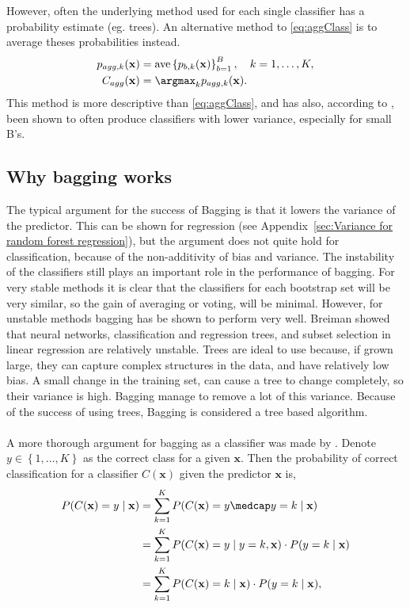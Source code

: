 However, often the underlying method used for each single classifier has a probability estimate (eg. trees). An alternative method to \eqref{eq:aggClass} is to average theses probabilities instead.
\begin{align}
  p_{agg, k}(\mathbf{x}) &=  \mathrm{ave}\left\{ p_{b, k}(\mathbf{x}) \right\}_{b = 1}^{B}, \quad k = 1, \ldots, K, \\
  \label{eq:aggClassP} 
  C_{agg}(\mathbf{x}) &= \argmax_k p_{agg, k}(\mathbf{x}).
\end{align}
This method is more descriptive than \eqref{eq:aggClass}, and has also, according to \cite{modstat}, been shown to often produce classifiers with lower variance, especially for small B's.

\subsection{Why bagging works}
\label{sub:Why bagging works}
The typical argument for the success of Bagging is that it lowers the variance of the predictor. This can be shown for regression (see Appendix~\ref{sec:Variance for random forest regression}), but the argument does not quite hold for classification, because of the non-additivity of bias and variance. The instability of the classifiers still plays an important role in the performance of bagging. For very stable methods it is clear that the classifiers for each bootstrap set will be very similar, so the gain of averaging or voting, will be minimal. However, for unstable methods bagging has be shown to perform very well. Breiman showed that neural networks, classification and regression trees, and subset selection in linear regression are relatively unstable.
Trees are ideal to use because, if grown large, they can capture complex structures in the data, and have relatively low bias. A small change in the training set, can cause a tree to change completely, so their variance is high. Bagging manage to remove a lot of this variance. Because of the success of using trees, Bagging is considered a tree based algorithm.
\\
\\
A more thorough argument for bagging as a classifier was made by \cite{Breiman1996}. Denote $y \in \left\{ 1, \ldots, K \right\}$ as the correct class for a given $\mathbf{x}$. Then the probability of correct classification for a classifier $C(\mathbf{x})$ given the predictor $\mathbf{x}$ is,
\begin{align}
  P(C(\mathbf{x}) = y \mid \mathbf{x})  &= \sum^{K}_{k=1} P(C(\mathbf{x})=y \medcap y = k \mid \mathbf{x}) \notag \\
  &= \sum^{K}_{k=1} P(C(\mathbf{x}) = y \mid y = k, \mathbf{x}) \cdot P(y=k \mid \mathbf{x}) \notag \\
  &= \sum^{K}_{k=1} P(C(\mathbf{x}) = k \mid \mathbf{x}) \cdot P(y=k \mid \mathbf{x}), 
\end{align}
